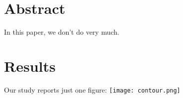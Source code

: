 \documentclass{report}
\begin{document}
\section*{Abstract}
In this paper, we don't do very much.
\section*{Results}
Our study reports just one figure:
\texttt{[image: contour.png]}
\end{document}
